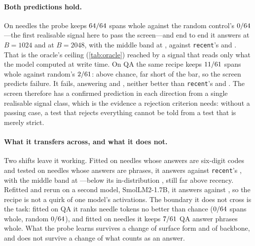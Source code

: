 \documentclass[10pt]{article}
\begin{document}
\begin{table}[ht]\centering\small
\caption{The supervised probe against the screen's two predictions
(\cref{sec:probe}). Screen at $B{=}2048$ over 61--64 spans; end-to-end cells are
24 queries on seeds $100$--$102$, disjoint from the probe's training seeds. It
passes the screen in-task on needles and then matches the oracle; it fails the
screen on QA and then performs at \texttt{recent}'s level. A dash marks a
combination not run.}
\label{tab:probe}
\TabProbe
\end{table}

\paragraph{Both predictions hold.} On needles the probe keeps
$64/64$ \ProbeNeedleNeedleCI{} spans whole against the random
control's $0/64$---the first realisable signal here to pass
the screen---and end to end it answers \ProbeESmall{}
\ProbeESmallCI{} at $B{=}1024$ and \ProbeELarge{} at $B{=}2048$, with the
middle band at \ProbeESmallMid, against \texttt{recent}'s \RecentESmall{} and
\RecentESmallMid. That is the oracle's ceiling (\cref{tab:oracle})
reached by a signal that reads only what the model computed at write time. On
QA the same recipe keeps $11/61$ \ProbeQaQaCI{} spans whole against
random's $2/61$: above chance, far short of the bar, so the screen
predicts failure. It fails, answering \ProbeEQASmall{} and \ProbeEQALarge,
neither better than \texttt{recent}'s \RecentEQASmall{} and \RecentEQALarge.
The screen therefore has a confirmed prediction in each direction from a single
realisable signal class, which is the evidence a rejection criterion needs:
without a passing case, a test that rejects everything cannot be told from a
test that is merely strict.

\paragraph{What it transfers across, and what it does not.} Two shifts leave it
working. Fitted on needles whose answers are six-digit codes and tested on
needles whose answers are phrases, it answers \ProbeEStyleSmall{}
\ProbeEStyleSmallCI{} against \texttt{recent}'s \RecentEStyleSmall, with the
middle band at \ProbeEStyleSmallMid---below its in-distribution
\ProbeESmall, still far above recency. Refitted and rerun on a second model,
SmolLM2-1.7B, it answers \ProbeESmolSmall{} \ProbeESmolSmallCI{} against
\RecentESmolSmall, so the recipe is not a quirk of one model's activations.
The boundary it does not cross is the task: fitted on QA it ranks needle tokens
no better than chance ($0/64$ spans whole, random
$0/64$), and fitted on needles it keeps $7/61$ QA
answer phrases whole. What the probe learns survives a change of surface form
and of backbone, and does not survive a change of what counts as an answer.
\end{document}
